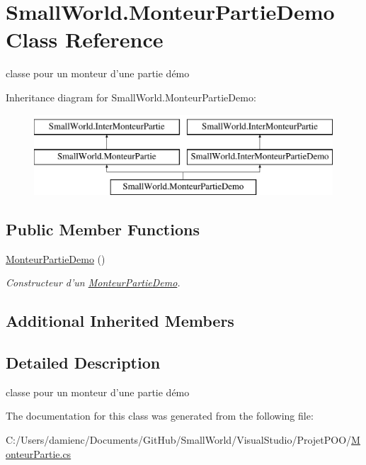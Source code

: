 \hypertarget{class_small_world_1_1_monteur_partie_demo}{\section{Small\-World.\-Monteur\-Partie\-Demo Class Reference}
\label{class_small_world_1_1_monteur_partie_demo}
}


classe pour un monteur d'une partie démo  


Inheritance diagram for Small\-World.\-Monteur\-Partie\-Demo\-:\begin{figure}[H]
\begin{center}
\leavevmode
\includegraphics[height=3.000000cm]{class_small_world_1_1_monteur_partie_demo}
\end{center}
\end{figure}
\subsection*{Public Member Functions}
\begin{DoxyCompactItemize}
\item 
\hypertarget{class_small_world_1_1_monteur_partie_demo_aad8fb3b06db6f02910dbb256d2233a0a}{\hyperlink{class_small_world_1_1_monteur_partie_demo_aad8fb3b06db6f02910dbb256d2233a0a}{Monteur\-Partie\-Demo} ()}\label{class_small_world_1_1_monteur_partie_demo_aad8fb3b06db6f02910dbb256d2233a0a}

\begin{DoxyCompactList}\small\item\em Constructeur d'un \hyperlink{class_small_world_1_1_monteur_partie_demo}{Monteur\-Partie\-Demo}. \end{DoxyCompactList}\end{DoxyCompactItemize}
\subsection*{Additional Inherited Members}


\subsection{Detailed Description}
classe pour un monteur d'une partie démo 

The documentation for this class was generated from the following file\-:\begin{DoxyCompactItemize}
\item 
C\-:/\-Users/damienc/\-Documents/\-Git\-Hub/\-Small\-World/\-Visual\-Studio/\-Projet\-P\-O\-O/\hyperlink{_monteur_partie_8cs}{Monteur\-Partie.\-cs}\end{DoxyCompactItemize}
